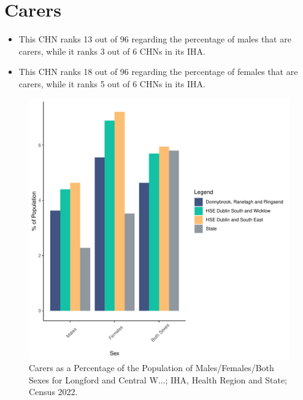 \documentclass{article}
\begin{document}
\section{Carers}\label{sect:Carers}
\begin{itemize}
\item This CHN ranks  13 out of 96 regarding the percentage of males that are carers, while it ranks   3 out of 6 CHNs in its IHA.
\item This CHN ranks  18 out of 96 regarding the percentage of females that are carers, while it ranks   5 out of 6 CHNs in its IHA.
\end{itemize}
\begin{figure}[H]
	\centering
	\includegraphics[width = 150mm]{../figures/CareED.pdf}
	\caption{Carers as a Percentage of the Population of Males/Females/Both Sexes for Longford and Central W...; IHA, Health Region and State; Census 2022.}
	\label{fig:2ae19629-1a6a-13a3-e055-000000000001}
	\end{figure}
\end{document}
